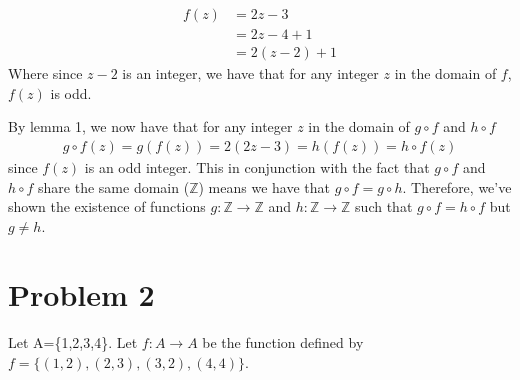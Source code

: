 \documentclass[11pt, letterpaper]{article}
\begin{document}
\begin{prf}
\begin{lemma}
        \begin{align*}
            f(z)&=2z-3\\
            &=2z-4+1\\
            &=2(z-2)+1
        \end{align*}
        Where since $z-2$ is an integer, we have that for any integer $z$ in the domain of $f$, $f(z)$ is odd.\\
    \end{lemma}
    \noindent By lemma 1, we now have that for any integer $z$ in the domain of $g\circ f$ and $h\circ f$
    \begin{align*}
        g\circ f(z)=g(f(z))=2(2z-3)=h(f(z))=h\circ f(z)
    \end{align*}
    since $f(z)$ is an odd integer. This in conjunction with the fact that $g\circ f$ and $h\circ f$ share the same domain ($\mathbb{Z}$) means we have that $g\circ f= g\circ h$. Therefore, we've shown the existence of functions $g:\mathbb{Z}\rightarrow\mathbb{Z}$ and $h:\mathbb{Z}\rightarrow\mathbb{Z}$ such that $g\circ f=h\circ f$ but $g\neq h$.
\end{prf}
\section*{Problem 2}
{\large Let A=\{1,2,3,4\}. Let $f:A\rightarrow A$ be the function defined by $f=\{(1,2),(2,3),(3,2),(4,4)\}$.}
\end{document}
